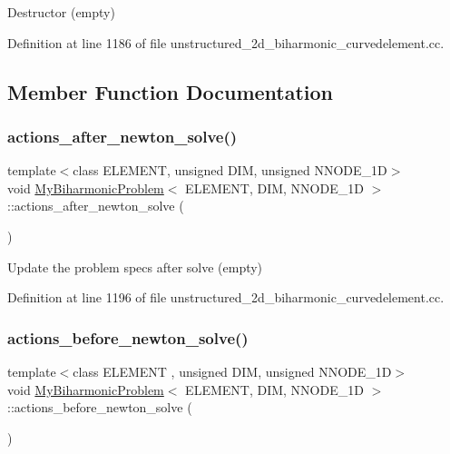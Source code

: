 Destructor (empty) 



Definition at line 1186 of file unstructured\+\_\+2d\+\_\+biharmonic\+\_\+curvedelement.\+cc.



\subsection{Member Function Documentation}
\mbox{\label{classMyBiharmonicProblem_a0600c4a7dff6f362b6171c66e07b594c}} 
\subsubsection{\texorpdfstring{actions\+\_\+after\+\_\+newton\+\_\+solve()}{actions\_after\_newton\_solve()}}
{\footnotesize\ttfamily template$<$class E\+L\+E\+M\+E\+NT, unsigned D\+IM, unsigned N\+N\+O\+D\+E\+\_\+1D$>$ \\
void \hyperlink{classMyBiharmonicProblem}{My\+Biharmonic\+Problem}$<$ E\+L\+E\+M\+E\+NT, D\+IM, N\+N\+O\+D\+E\+\_\+1D $>$\+::actions\+\_\+after\+\_\+newton\+\_\+solve (\begin{DoxyParamCaption}{ }\end{DoxyParamCaption})\hspace{0.3cm}{\ttfamily [inline]}}



Update the problem specs after solve (empty) 



Definition at line 1196 of file unstructured\+\_\+2d\+\_\+biharmonic\+\_\+curvedelement.\+cc.

\mbox{\label{classMyBiharmonicProblem_ae9a9d6db2c84c3cc12138558b60d676d}} 
\subsubsection{\texorpdfstring{actions\+\_\+before\+\_\+newton\+\_\+solve()}{actions\_before\_newton\_solve()}}
{\footnotesize\ttfamily template$<$class E\+L\+E\+M\+E\+NT , unsigned D\+IM, unsigned N\+N\+O\+D\+E\+\_\+1D$>$ \\
void \hyperlink{classMyBiharmonicProblem}{My\+Biharmonic\+Problem}$<$ E\+L\+E\+M\+E\+NT, D\+IM, N\+N\+O\+D\+E\+\_\+1D $>$\+::actions\+\_\+before\+\_\+newton\+\_\+solve (\begin{DoxyParamCaption}{ }\end{DoxyParamCaption})}



